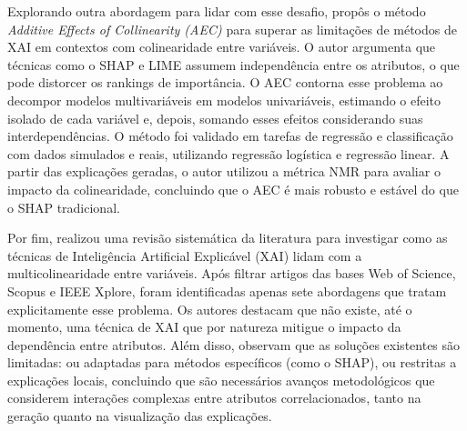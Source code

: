 Explorando outra abordagem para lidar com esse desafio,  propôs o método \textit{Additive Effects of Collinearity (AEC)} para superar as limitações de métodos de XAI em contextos com colinearidade entre variáveis. O autor argumenta que técnicas como o SHAP e LIME assumem independência entre os atributos, o que pode distorcer os rankings de importância. O AEC contorna esse problema ao decompor modelos multivariáveis em modelos univariáveis, estimando o efeito isolado de cada variável e, depois, somando esses efeitos considerando suas interdependências. O método foi validado em tarefas de regressão e classificação com dados simulados e reais, utilizando regressão logística e regressão linear. A partir das explicações geradas, o autor utilizou a métrica NMR para avaliar o impacto da colinearidade, concluindo que o AEC é mais robusto e estável do que o SHAP tradicional.

Por fim,  realizou uma revisão sistemática da literatura para investigar como as técnicas de Inteligência Artificial Explicável (XAI) lidam com a multicolinearidade entre variáveis. Após filtrar artigos das bases Web of Science, Scopus e IEEE Xplore, foram identificadas apenas sete abordagens que tratam explicitamente esse problema. Os autores destacam que não existe, até o momento, uma técnica de XAI que por natureza mitigue o impacto da dependência entre atributos. Além disso, observam que as soluções existentes são limitadas: ou adaptadas para métodos específicos (como o SHAP), ou restritas a explicações locais, concluindo que são necessários avanços metodológicos que considerem interações complexas entre atributos correlacionados, tanto na geração quanto na visualização das explicações.




